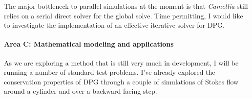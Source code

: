 \documentclass[letterpaper]{article}
\begin{document}
The major bottleneck to parallel simulations at the moment is that \emph{Camellia} still relies on a serial direct solver for the global solve.
Time permitting, I would like to investigate the implementation of an effective iterative solver for DPG.



\paragraph{Area C: Mathematical modeling and applications}
As we are exploring a method that is still very much in development, I will be running a number of standard test problems.
I've already explored the conservation properties of DPG through a couple of simulations of Stokes flow around a cylinder and over
a backward facing step.
\end{document}
